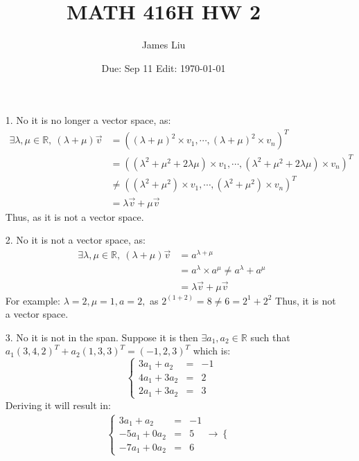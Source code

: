 \documentclass{article}
\date{Due: Sep 11 Edit: \today}
\title{MATH 416H HW 2}
\author{James Liu}
\begin{document}
\maketitle

\begin{itemize}
    \item [1.] No it is no longer a vector space, as:
    \begin{align*}
        \exists \lambda,\mu \in \mathbb{R},\ (\lambda+\mu)\overrightarrow{v}&= ((\lambda+\mu)^2\times v_1,\cdots,(\lambda+\mu)^2\times v_n)^T
        \\ &=((\lambda^2+\mu^2+2\lambda\mu)\times v_1,\cdots,(\lambda^2+\mu^2+2\lambda\mu)\times v_n)^T
        \\ &\neq ((\lambda^2+\mu^2)\times v_1,\cdots,(\lambda^2+\mu^2)\times v_n)^T
        \\ &= \lambda \overrightarrow{v}+\mu\overrightarrow{v}
    \end{align*}
    Thus, as it is not a vector space.
    \item [2.] No it is not a vector space, as:
    \begin{align*}
        \exists \lambda,\mu \in \mathbb{R},\ (\lambda+\mu)\overrightarrow{v}&= a^{\lambda+\mu}\\
        & = a^\lambda\times a^\mu \neq a^\lambda+a^\mu\\
        & = \lambda\overrightarrow{v}+\mu\overrightarrow{v}
    \end{align*}
    For example: \(\lambda=2,\mu=1,a=2,\) as \(2^{(1+2)}=8\neq6=2^1+2^2\)
    Thus, it is not a vector space.
    \item [3.] No it is not in the span. Suppose it is then \(\exists a_1,a_2\in\mathbb{R}\) such that \(a_1(3, 4, 2)^T + a_2(1, 3, 3)^T =(-1,2,3)^T\)
    which is:
    \[\left\{ \begin{matrix}
        3a_1+a_2&=&-1\\
        4a_1+3a_2&=&2\\
        2a_1+3a_2&=&3
    \end{matrix} \right.\]
    Deriving it will result in:
    \begin{align}
        \left\{ \begin{matrix}
            3a_1+a_2&=&-1\\
            -5a_1+0a_2&=&5\\
            -7a_1+0a_2&=&6
        \end{matrix} \right.\rightarrow
        \left\{ \begin{matrix}

\end{matrix}
\end{align}
\end{itemize}
\end{document}
